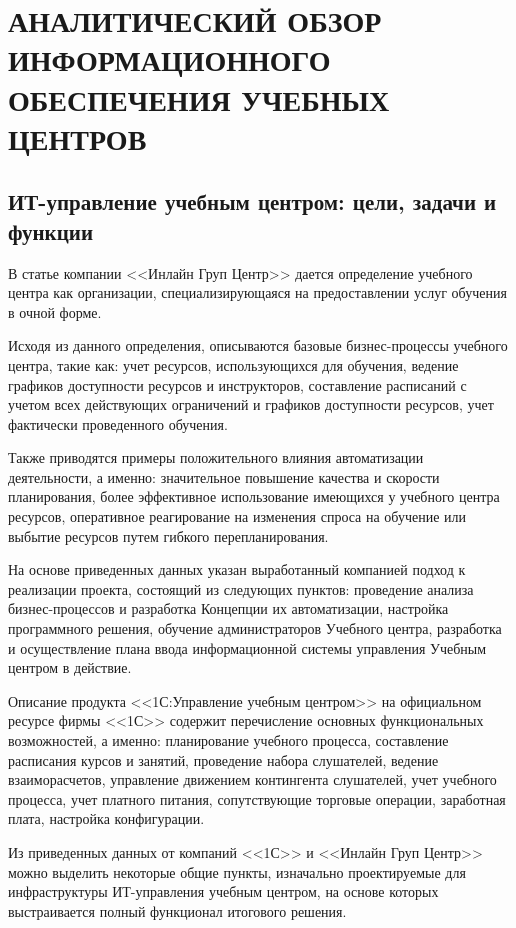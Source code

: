 \section{АНАЛИТИЧЕСКИЙ ОБЗОР ИНФОРМАЦИОННОГО \newline ОБЕСПЕЧЕНИЯ УЧЕБНЫХ ЦЕНТРОВ}


\subsection{ИТ-управление учебным центром: цели, задачи и функции}

В статье компании <<Инлайн Груп Центр>> \cite{inlinegroup-c} дается определение учебного центра как организации, специализирующаяся на предоставлении услуг обучения в очной форме.

Исходя из данного определения, описываются базовые бизнес-процессы учебного центра, такие как: учет ресурсов, использующихся для обучения, ведение графиков доступности ресурсов и инструкторов, составление расписаний с учетом всех действующих ограничений и графиков доступности ресурсов, учет фактически проведенного обучения.

Также приводятся примеры положительного влияния автоматизации деятельности, а именно: значительное повышение качества и скорости планирования, более эффективное использование имеющихся у учебного центра ресурсов, оперативное реагирование на изменения спроса на обучение или выбытие ресурсов путем гибкого перепланирования.

На основе приведенных данных указан выработанный компанией подход к реализации проекта, состоящий из следующих пунктов: проведение анализа бизнес-процессов и разработка Концепции их автоматизации, настройка программного решения, обучение администраторов Учебного центра, разработка и осуществление плана ввода информационной системы управления Учебным центром в действие.

Описание продукта <<1С:Управление учебным центром>> на официальном ресурсе фирмы <<1С>> \cite{1c-training-center} содержит перечисление основных функциональных возможностей, а именно: планирование учебного процесса, составление расписания курсов и занятий, проведение набора слушателей, ведение взаиморасчетов, управление движением контингента слушателей, учет учебного процесса, учет платного питания, сопутствующие торговые операции, заработная плата, настройка конфигурации.

Из приведенных данных от компаний <<1С>> и <<Инлайн Груп Центр>> можно выделить некоторые общие пункты, изначально проектируемые для инфраструктуры ИТ-управления учебным центром, на основе которых выстраивается полный функционал итогового решения.


